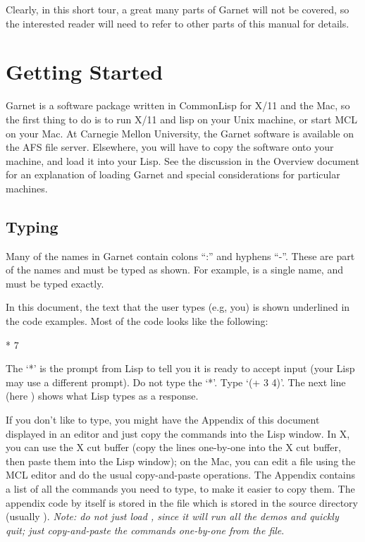 Clearly, in this short tour, a great many parts of Garnet will not be
covered, so the interested reader will need to refer to other parts of this
manual for details.

\chapter{Getting Started}
\label{startlisp}

Garnet is a software package written in CommonLisp for X/11 and the Mac,
so the first thing to do is to run X/11 and lisp on your Unix machine, or
start MCL on your Mac.  At Carnegie Mellon University, the Garnet
software is available on the AFS file server.  Elsewhere, you will
have to copy the software onto your machine, and load it into your
Lisp.  See the discussion in the Overview document for an explanation
of loading Garnet and special considerations for particular machines.


\section{Typing}
\label{typing}

Many of the names in Garnet contain colons ``:'' and hyphens ``-''.  These
are part of the names and must be typed as shown.  For example,
 is a single name, and must be typed exactly.

In this document, the text that the user types (e.g, you) is shown underlined
in the code examples.  Most of the code looks like the following:
\begin{programexample}
* 
7
\end{programexample}
The `*' is the prompt from Lisp to tell you it is ready to accept input
(your Lisp may use a different prompt).
Do not type the `*'.  Type `(+ 3 4)'.  The next line (here )
shows what Lisp types as a response.

If you don't like to type, you might have the Appendix of this document
displayed in an editor and just copy the commands into the Lisp
window.  In X, you can use the X cut buffer (copy the lines one-by-one
into the X cut buffer, then paste them into the Lisp window);  on the
Mac, you can edit a file using the MCL editor and do the usual
copy-and-paste operations.
The Appendix contains a list of all the commands you need to
type, to make it easier to copy them.
The appendix code by itself is stored in
the file  which is stored in the  source
directory (usually ).
{\it Note: do
not just load , since it will run all the demos and quickly
quit; just copy-and-paste the commands one-by-one from the file}.

